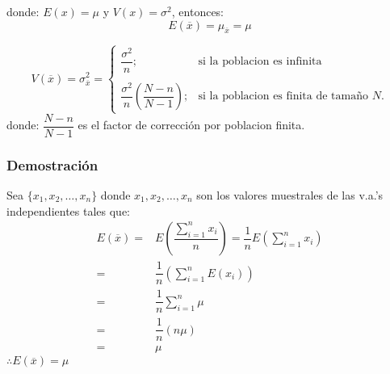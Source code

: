 donde: $E(x) = \mu$ y $V(x) =\sigma^2$, entonces:
$$E(\overline{x}) = \mu_{\overline{x}} = \mu$$

$$
V(\overline{x}) = \sigma^2_{\overline{x}}= 
\begin{cases}
\dfrac{\sigma^2}{n} ;&\text{si la poblacion es infinita}\\
& \\
\dfrac{\sigma^2}{n}\left(\dfrac{N-n}{N-1}\right) ;& \text{si la poblacion es finita de tamaño $N$.}
\end{cases}
$$
donde: $\dfrac{N-n}{N-1}$ es el factor de corrección por poblacion finita.
\subsubsection{Demostración}
Sea $\{x_1,x_2,\ldots,x_n\}$ donde $x_1,x_2,\ldots,x_n$ son los valores muestrales de las v.a.'s independientes tales que:
\begin{align*}
E(\overline{x}) =& E\left(\dfrac{\displaystyle\sum_{i=1}^{n} x_i}{n}\right) = \dfrac{1}{n}E\left(  \displaystyle\sum_{i=1}^{n} x_i \right) \\
=& \dfrac{1}{n} \left(  \displaystyle\sum_{i=1}^{n} E(x_i) \right) \\ 
=& \dfrac{1}{n}\displaystyle\sum_{i=1}^{n} \mu \\
=& \dfrac{1}{n} (n\mu) \\
=& \mu
\end{align*}
$\therefore E(\overline{x}) = \mu$